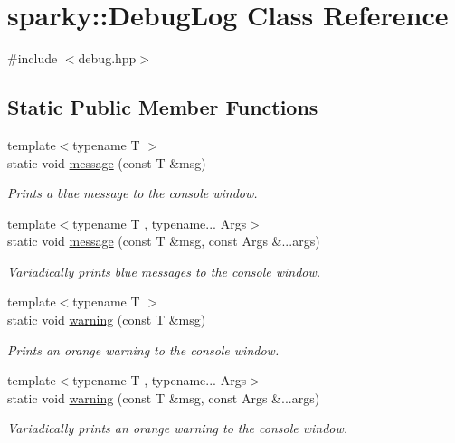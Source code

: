 \hypertarget{classsparky_1_1_debug_log}{}\section{sparky\+:\+:Debug\+Log Class Reference}
\label{classsparky_1_1_debug_log}


{\ttfamily \#include $<$debug.\+hpp$>$}

\subsection*{Static Public Member Functions}
\begin{DoxyCompactItemize}
\item 
{\footnotesize template$<$typename T $>$ }\\static void \hyperlink{classsparky_1_1_debug_log_a2ed80214bbc9972b1da0ac2265dc0714}{message} (const T \&msg)
\begin{DoxyCompactList}\small\item\em Prints a blue message to the console window. \end{DoxyCompactList}\item 
{\footnotesize template$<$typename T , typename... Args$>$ }\\static void \hyperlink{classsparky_1_1_debug_log_ad1ca1302cf46ee6f428ab92962975467}{message} (const T \&msg, const Args \&...args)
\begin{DoxyCompactList}\small\item\em Variadically prints blue messages to the console window. \end{DoxyCompactList}\item 
{\footnotesize template$<$typename T $>$ }\\static void \hyperlink{classsparky_1_1_debug_log_aa49f9dd55fc30378f680401b5618267e}{warning} (const T \&msg)
\begin{DoxyCompactList}\small\item\em Prints an orange warning to the console window. \end{DoxyCompactList}\item 
{\footnotesize template$<$typename T , typename... Args$>$ }\\static void \hyperlink{classsparky_1_1_debug_log_a8c17fb6ece4b8d65ac21d5babba1f5b5}{warning} (const T \&msg, const Args \&...args)
\begin{DoxyCompactList}\small\item\em Variadically prints an orange warning to the console window. \end{DoxyCompactList}\item 

\end{DoxyCompactItemize}
